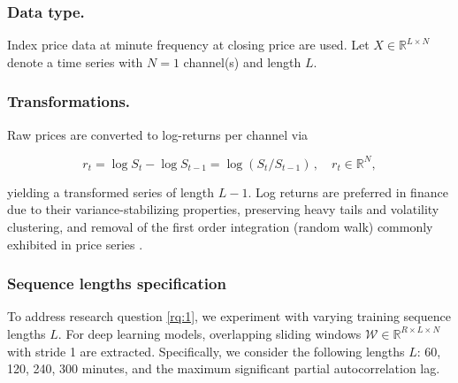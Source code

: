\documentclass[sigconf]{acmart}
\begin{document}
    \subsubsection{Data type.} Index price data at 
      minute frequency at closing price are 
      used. Let \(X \in \mathbb{R}^{L \times N}\) denote a 
      time series with \(N=1\) channel(s) and length 
      \(L\).

    \subsubsection{Transformations.}\label{sec:transformations}
      Raw prices are converted to log-returns per channel via

      \[ r_t = \log S_t - \log S_{t-1} = \log(S_t / S_{t-1}) \,, 
      \quad r_t \in \mathbb{R}^N, \]
      
      yielding a transformed series of length \(L-1\). Log returns 
      are preferred in finance due to their variance-stabilizing 
      properties, preserving heavy tails and volatility clustering,
      and removal of the first order integration (random walk) 
      commonly exhibited in price series \cite{Takahashi24}.

    \subsubsection{Sequence lengths specification}\label{sec:sequence_length}
      To address research question \ref{rq:1}, we 
        experiment with varying training sequence lengths \(L\).
        For deep learning models, overlapping sliding windows 
        \(\mathcal{W} \in \mathbb{R}^{R \times L \times N}\) with 
        stride 1 are extracted.
        Specifically, we consider the following lengths \( L \):
        60, 120, 240, 300 minutes, and the maximum significant 
        partial autocorrelation lag.
      
\end{document}
